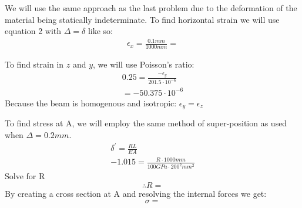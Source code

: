 \documentclass[12pt]{article}
\begin{document}
We will use the same approach as the last problem due to the deformation of the material being statically indeterminate. To find horizontal strain we will use equation 2 with $\Delta = \delta$ like so:
\begin{gather*}
\epsilon_{x} = \frac{0.1 mm}{1000mm} = 
\end{gather*}

To find strain in $z$ and $y$, we will use Poisson's ratio:
\begin{gather*}
0.25 = \frac{-\epsilon_{y}}{201.5 \cdot 10^{-6}}\\
=-50.375 \cdot 10^{-6}
\end{gather*}
Because the beam is homogenous and isotropic: $\epsilon_{y} = \epsilon_{z}$
\newline

To find stress at A, we will employ the same method of super-position as used when $\Delta = 0.2mm$.
\begin{gather*}
\delta^{'} = \frac{RL}{EA}\\
-1.015 = \frac{R \cdot 1000mm}{100 GPa \cdot 200^{2} mm^{2}}
\end{gather*}
Solve for R
\begin{equation*}
\therefore R=
\end{equation*}
By creating a cross section at A and resolving the internal forces we get:
\begin{equation*}
\sigma = 
\end{equation*}
\end{document}
